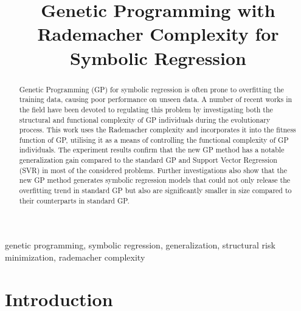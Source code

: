 \documentclass[conference]{IEEEtran}
\begin{document}

\title{Genetic Programming with Rademacher Complexity for Symbolic Regression}


\author{
}

\maketitle



\begin{abstract}
Genetic Programming (GP) for symbolic regression is often prone to overfitting the training data, causing poor performance on unseen data. A number of recent works in the field have been devoted to regulating this problem by investigating both the structural and functional complexity of GP individuals during the evolutionary process. This work uses the Rademacher complexity and incorporates it into the fitness function of GP, utilising it as a means of controlling the functional complexity of GP individuals. The experiment results confirm that the new GP method has a notable generalization gain compared to the standard GP and Support Vector Regression (SVR) in most of the considered problems. Further investigations also show that the new GP method generates symbolic regression models that could not only release the overfitting trend in standard GP but also are significantly smaller in size compared to their counterparts in standard GP.
\end{abstract}



\begin{IEEEkeywords}
genetic programming, symbolic regression, generalization, structural risk minimization, rademacher complexity
\end{IEEEkeywords}



\section{Introduction}
\end{document}
